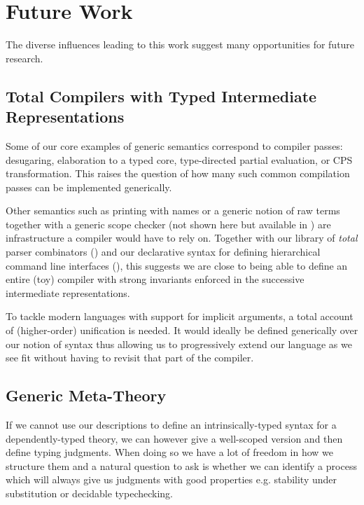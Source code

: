\section{Future Work}

The diverse influences leading to this work suggest many opportunities
for future research.

\subsection{Total Compilers with Typed Intermediate Representations}

Some of our core examples of generic semantics correspond to compiler passes:
desugaring, elaboration to a typed core, type-directed partial evaluation,
or CPS transformation. This raises the question of how many such common
compilation passes can be implemented generically.

Other semantics such as printing with names or a generic notion of raw terms
together with a generic scope checker (not shown here but available in
\cite{repo2018})
are infrastructure a compiler would have to rely on. Together with our library
of \emph{total} parser combinators (\cite{allais2018agdarsec}) and our
declarative
syntax for defining hierarchical command line interfaces (\cite{allaisagdargs}),
this suggests we are close to being able to define an entire (toy) compiler with
strong invariants enforced in the successive intermediate representations.

To tackle modern languages with support for implicit arguments, a total account
of (higher-order) unification is needed. It would ideally be defined generically
over our notion of syntax thus allowing us to progressively extend our language
as we see fit without having to revisit that part of the compiler.

\subsection{Generic Meta-Theory}

If we cannot use our descriptions to define an intrinsically-typed syntax for
a dependently-typed theory, we can however give a well-scoped version and then
define typing judgments. When doing so we have a lot of freedom in how we
structure them and a natural question to ask is whether we can identify a
process which will always give us judgments with good properties e.g.
stability under substitution or decidable typechecking.


